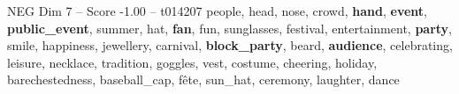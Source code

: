 \begin{textsample}{NEG Dim 7 – Score -1.00 – t014207}  \label{ex:f7_neg_005}
people, head, nose, crowd, \textbf{hand}, \textbf{event}, \textbf{public\_event}, summer, hat, \textbf{fan}, fun, sunglasses, festival, entertainment, \textbf{party}, smile, happiness, jewellery, carnival, \textbf{block\_party}, beard, \textbf{audience}, celebrating, leisure, necklace, tradition, goggles, vest, costume, cheering, holiday, barechestedness, baseball\_cap, fête, sun\_hat, ceremony, laughter, dance

\end{textsample}
